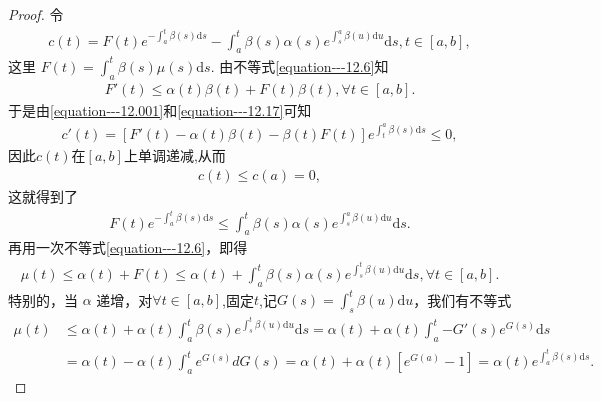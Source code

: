 \documentclass[../../main.tex]{subfiles}
\begin{document}
\begin{proof}
令
\begin{align}
c(t)=F(t)e^{-\int_{a}^{t}\beta(s)\mathrm{d}s}-\int_{a}^{t}\beta(s)\alpha(s)e^{\int_{s}^{a}\beta(u)\mathrm{d}u}\mathrm{d}s,t\in[a,b],\label{equation---12.001}
\end{align}
这里 $F(t)=\int_{a}^{t}\beta(s)\mu(s)\mathrm{d}s$. 由不等式\eqref{equation---12.6}知
\begin{align}
F'(t)\leqslant\alpha(t)\beta(t)+F(t)\beta(t),\forall t\in[a,b].\label{equation---12.17}
\end{align}
于是由\eqref{equation---12.001}和\eqref{equation---12.17}可知
\begin{align*}
c'(t)=[F'(t)-\alpha(t)\beta(t)-\beta(t)F(t)]e^{\int_{t}^{a}\beta(s)\mathrm{d}s}\leqslant0,
\end{align*}
因此$c(t)$在$[a,b]$上单调递减,从而
\begin{align*}
c(t)\leqslant c(a)=0,
\end{align*}
这就得到了
\begin{align*}
F(t)e^{-\int_{a}^{t}\beta(s)\mathrm{d}s}\leqslant\int_{a}^{t}\beta(s)\alpha(s)e^{\int_{s}^{a}\beta(u)\mathrm{d}u}\mathrm{d}s.
\end{align*}
再用一次不等式\eqref{equation---12.6}，即得
\begin{align*}
\mu(t)\leqslant\alpha(t)+F(t)\leqslant\alpha(t)+\int_{a}^{t}\beta(s)\alpha(s)e^{\int_{s}^{t}\beta(u)\mathrm{d}u}\mathrm{d}s,\forall t\in[a,b].
\end{align*}
特别的，当 $\alpha$ 递增，对$\forall t\in [a,b]$,固定$t$,记$G(s)=\int_s^t{\beta (u)\mathrm{d}u}$，我们有不等式
\begin{align*}
\mu (t)&\leqslant \alpha (t)+\alpha (t)\int_a^t{\beta (s)e^{\int_s^t{\beta (u)\mathrm{d}u}}\mathrm{d}s}=\alpha (t)+\alpha (t)\int_a^t{-G' \left( s \right) e^{G\left( s \right)}\mathrm{d}s}
\\
&=\alpha (t)-\alpha (t)\int_a^t{e^{G\left( s \right)}dG\left( s \right)}=\alpha (t)+\alpha (t)\left[ e^{G\left( a \right)}-1 \right] =\alpha (t)e^{\int_a^t{\beta (s)\mathrm{d}s}}.
\end{align*} 
\end{proof}
\end{document}
